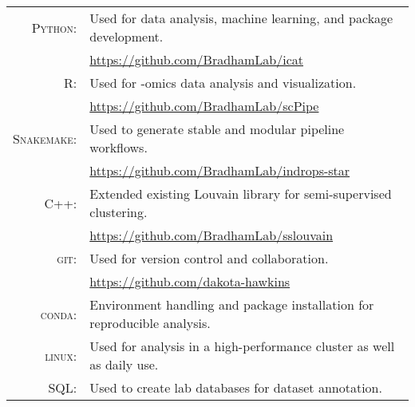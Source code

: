 \documentclass[a4paper,10pt]{report}
\begin{document}
\section{\color{linkcolour}{Programming Languages and Tooling}}
\begin{longtable}{rp{12cm}}
	\textsc{Python:}    & Used for data analysis, machine learning, and package development.                                    \\
	                    & \small{\href{https://github.com/BradhamLab/icat}{https://github.com/BradhamLab/icat}}                 \\
	\textsc{R:}         & Used for -omics data analysis and visualization.                                                      \\
	                    & \small{\href{https://github.com/BradhamLab/scPipe}{https://github.com/BradhamLab/scPipe}}             \\
	\textsc{Snakemake:} & Used to generate stable and modular pipeline workflows.                                               \\
	                    & \small{\href{https://github.com/BradhamLab/indrops-star}{https://github.com/BradhamLab/indrops-star}} \\
	\textsc{C++:}       & Extended existing Louvain library for semi-supervised clustering.                                     \\
	                    & \small{\href{https://github.com/BradhamLab/sslouvain}{https://github.com/BradhamLab/sslouvain}}       \\
	\textsc{git}:       & Used for version control and collaboration.                                                           \\
	                    & \small{\href{https://github.com/dakota-hawkins}{https://github.com/dakota-hawkins}}                   \\
	\textsc{conda}:     & Environment handling and package installation for reproducible analysis.                              \\
	\textsc{linux}:     & Used for analysis in a high-performance cluster as well as daily use.                                 \\
	\textsc{SQL}:       & Used to create lab databases for dataset annotation.                                                  \\
\end{longtable}

\end{document}
